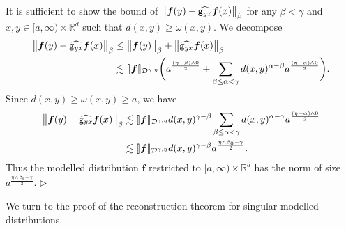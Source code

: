 \documentclass[10pt, reqno]{amsart}
\numberwithin{subsection}{section}
\numberwithin{subsubsection}{subsection}
\numberwithin{equation}{section} %
\newenvironment{Dem}[1][\unskip]{%
    \begin{list}{\hspace{1.15cm}{\sf \textbf{{\small Proof #1 --}}}}{%
        \setlength{\topsep}{0pt}%
        \setlength{\leftmargin}{0pt}%
        \setlength{\rightmargin}{0pt}%
        \setlength{\listparindent}{0pt}%
        \setlength{\itemindent}{0pt}%
        \setlength{\parsep}{0pt}%
        \addtolength{\leftmargin}{0pt}%
        \addtolength{\rightmargin}{0pt}%
    } \item }{\hfill $\rhd$\end{list}\smallskip}
\theoremstyle{mystyle}
\theoremstyle{mystyle2}
\theoremstyle{mystyle3}
\newcommand{\brarb}[1]{[\hspace{-0.5mm}]#1[\hspace{-0.5mm}]}
\newcommand{\bsf}{\boldsymbol{f}}
\newcommand\bbR{\mathbb{R}}
\newcommand{\mcD}{\mathcal{D}}
\begin{document}
\medskip

\begin{Dem}
It is sufficient to show the bound of $\big\|\bsf(y)-\widehat{{\sf g}_{yx}}\bsf(x)\big\|_\beta$ for any $\beta<\gamma$ and $x,y\in[a,\infty)\times\bbR^d$ such that $d(x,y)\ge \omega(x,y)$. We decompose
\begin{align*}
\big\|\bsf(y)-\widehat{{\sf g}_{yx}}\bsf(x)\big\|_\beta
&\le\big\|\bsf(y)\big\|_\beta+\big\|\widehat{{\sf g}_{yx}}\bsf(x)\big\|_\beta\\
&\lesssim\brarb{\bsf}_{\mcD^{\gamma,\eta}}\bigg(a^{\frac{(\eta-\beta)\wedge0}2}+\sum_{\beta\le\alpha<\gamma}d(x,y)^{\alpha-\beta}a^{\frac{(\eta-\alpha)\wedge0}2}\bigg).
\end{align*}
Since $d(x,y)\ge\omega(x,y)\ge a$, we have
\begin{align*}
\big\|\bsf(y)-\widehat{{\sf g}_{yx}}\bsf(x)\big\|_\beta
&\lesssim\brarb{\bsf}_{\mcD^{\gamma,\eta}}d(x,y)^{\gamma-\beta}\sum_{\beta\le\alpha<\gamma}d(x,y)^{\alpha-\gamma}a^{\frac{(\eta-\alpha)\wedge0}2}\\
&\lesssim\brarb{\bsf}_{\mcD^{\gamma,\eta}}d(x,y)^{\gamma-\beta}a^{\frac{\eta\wedge\beta_0-\gamma}2}.
\end{align*}
Thus the modelled distribution $\bsf$ restricted to $[a,\infty)\times\bbR^d$ has the norm of size $a^{\frac{\eta\wedge\beta_0-\gamma}2}$.
\end{Dem}

\medskip

We turn to the proof of the reconstruction theorem for singular modelled distributions.

\medskip
\end{document}
